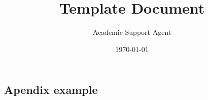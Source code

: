 \documentclass{article}
\title{Template Document}
\author{Academic Support Agent}
\date{\today}
\begin{document}
\maketitle






\setcounter{page}{1}



\setlength{\parskip}{0.6em}




\setcounter{page}{1}



\newpage




% 


% 


% 


% 


% 


% 



% 


% 

\newpage


\begin{appendices}
    \section{Apendix example}

\end{appendices}
\end{document}
